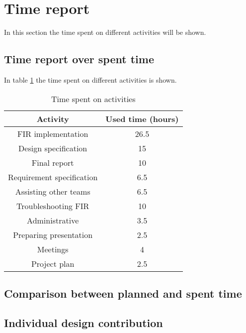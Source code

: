 \section{Time report}
In this section the time spent on different activities will be shown. 
\subsection{Time report over spent time}
In table \ref{tab:time} the time spent on different activities is shown.

\begin{table}[h]
  \caption{Time spent on activities}
  \label{tab:time}
  \centering
  \begin{tabular}{|c|c|}
    \hline
    \textbf{Activity} & \textbf{Used time (hours)} \\ \hline
    FIR implementation & 26.5 \\ \hline
    Design specification & 15 \\ \hline
    Final report & 10 \\ \hline
    Requirement specification & 6.5 \\ \hline
    Assisting other teams & 6.5 \\ \hline
    Troubleshooting FIR & 10 \\ \hline
    Administrative & 3.5 \\ \hline
    Preparing presentation & 2.5 \\ \hline
    Meetings & 4 \\ \hline
    Project plan & 2.5 \\ \hline
  \end{tabular}
  \end{table}
\subsection{Comparison between planned and spent time}
\subsection{Individual design contribution}